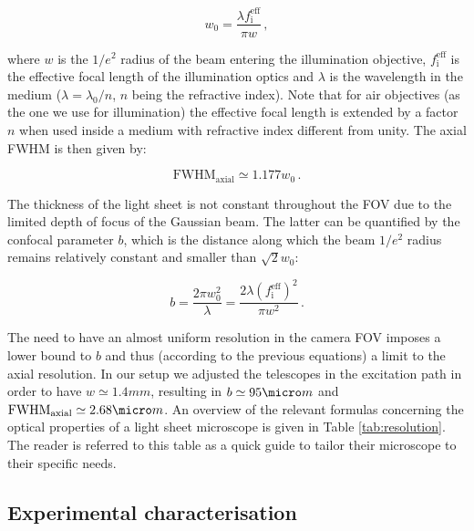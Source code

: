 \documentclass[12pt]{spieman}  %
\begin{document}
\begin{equation}
w_0 = \frac{\lambda f_{\text{i}}^{\text{eff}}}{\pi w} \, ,
\end{equation}

where $w$ is the $1/e^2$ radius of the beam entering the illumination objective, $ f_{\text{i}}^{\text{eff}}$ is the effective focal length of the illumination optics and $\lambda$ is the wavelength in the medium ($\lambda = \lambda_0 / n$, $n$ being the refractive index). Note that for air objectives (as the one we use for illumination) the effective focal length is extended by a factor $n$ when used inside a medium with refractive index different from unity\cite{Silvestri2012}.
The axial FWHM is then given by:

\begin{equation}
\text{FWHM}_{\text{axial}} \simeq 1.177 w_0 \, .
\end{equation}

The thickness of the light sheet is not constant throughout the FOV due to the limited depth of focus of the Gaussian beam. The latter can be quantified by the confocal parameter $b$, which is the distance along which the beam $1/e^2$ radius remains relatively constant and smaller than $\sqrt{2} w_0$:

\begin{equation}
b = \frac{2\pi w_0^2}{\lambda} = \frac{2 \lambda  {(f_{\text{i}}^{\text{eff}})}^2}{\pi w^2}\, .
\end{equation}

The need to have an almost uniform resolution in the camera FOV imposes a lower bound to $b$ and thus (according to the previous equations) a limit to the axial resolution. In our setup we adjusted the telescopes in the excitation path in order to have $w \simeq 1.4mm$, resulting in $b \simeq 95 \micro m$ and $\text{FWHM}_{\text{axial}} \simeq 2.68 \micro m$. An overview of the relevant formulas concerning the optical properties of a light sheet microscope is given in Table \ref{tab:resolution}. The reader is referred to this table as a quick guide to tailor their microscope to their specific needs.

\subsection{Experimental characterisation}
\end{document}
